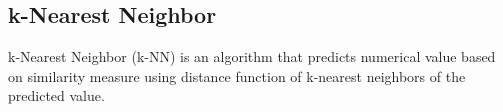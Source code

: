

	\subsection{k-Nearest Neighbor} %
	\label{sub:k_nearest_neighbor}
	k-Nearest Neighbor (\ac{k-NN}) is an algorithm that predicts numerical value based on similarity measure using distance function of k-nearest neighbors of the predicted value.


